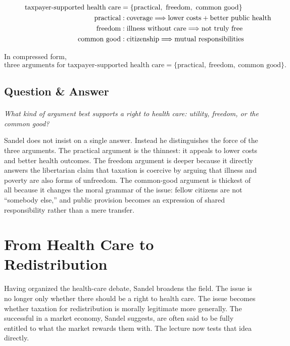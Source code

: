 \begin{figure}[h]
\centering
\begin{align}
\text{taxpayer-supported health care}
&=
\{\text{practical},\ \text{freedom},\ \text{common good}\} \notag\\
\text{practical}
&:
\text{coverage}
\Longrightarrow
\text{lower costs} + \text{better public health} \notag\\
\text{freedom}
&:
\text{illness without care}
\Longrightarrow
\text{not truly free} \notag\\
\text{common good}
&:
\text{citizenship}
\Longrightarrow
\text{mutual responsibilities} \notag
\end{align}
\end{figure}

In compressed form,
\begin{equation}
\text{three arguments for taxpayer-supported health care}
=
\{\text{practical},\ \text{freedom},\ \text{common good}\}.
\end{equation}

\subsection{Question \& Answer}

\paragraph{}
\emph{What kind of argument best supports a right to health care: utility, freedom, or the common good?}

Sandel does not insist on a single answer. Instead he distinguishes the force of the three arguments. The practical argument is the thinnest: it appeals to lower costs and better health outcomes. The freedom argument is deeper because it directly answers the libertarian claim that taxation is coercive by arguing that illness and poverty are also forms of unfreedom. The common-good argument is thickest of all because it changes the moral grammar of the issue: fellow citizens are not ``somebody else,'' and public provision becomes an expression of shared responsibility rather than a mere transfer.

\section{From Health Care to Redistribution}

Having organized the health-care debate, Sandel broadens the field. The issue is no longer only whether there should be a right to health care. The issue becomes whether taxation for redistribution is morally legitimate more generally. The successful in a market economy, Sandel suggests, are often said to be fully entitled to what the market rewards them with. The lecture now tests that idea directly.

